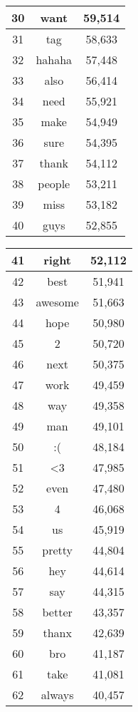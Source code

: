 \begin{table}[!htbp]
\begin{minipage}[b]{.5\textwidth}
\begin{tabular}{|c|c|c|}
		30 & want & 59,514 \\ \hline
		31 & tag & 58,633 \\ \hline
		32 & hahaha & 57,448 \\ \hline
		33 & also & 56,414 \\ \hline
		34 & need & 55,921 \\ \hline
		35 & make & 54,949 \\ \hline
		36 & sure & 54,395 \\ \hline
		37 & thank & 54,112 \\ \hline
		38 & people & 53,211 \\ \hline
		39 & miss & 53,182 \\ \hline
		40 & guys & 52,855 \\ \hline
		\end{tabular}
\end{minipage}
\begin{minipage}[b]{.5\textwidth}
\centering
\begin{tabular}{|c|c|c|} %
		\hline
		41 & right & 52,112 \\ \hline
		42 & best & 51,941 \\ \hline
		43 & awesome & 51,663 \\ \hline
		44 & hope & 50,980 \\ \hline
		45 & 2 & 50,720 \\ \hline
		46 & next & 50,375 \\ \hline
		47 & work & 49,459 \\ \hline
		48 & way & 49,358 \\ \hline
		49 & man & 49,101 \\ \hline
		50 & :( & 48,184 \\ \hline
		51 & <3 & 47,985 \\ \hline
		52 & even & 47,480 \\ \hline
		53 & 4 & 46,068 \\ \hline
		54 & us & 45,919 \\ \hline
		55 & pretty & 44,804 \\ \hline
		56 & hey & 44,614 \\ \hline
		57 & say & 44,315 \\ \hline
		58 & better & 43,357 \\ \hline
		59 & thanx & 42,639 \\ \hline
		60 & bro & 41,187 \\ \hline
		61 & take & 41,081 \\ \hline
		62 & always & 40,457 \\ \hline

\end{tabular}
\end{minipage}
\end{table}
